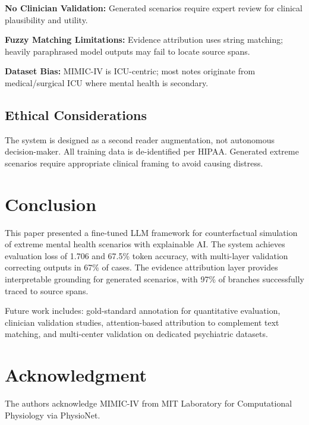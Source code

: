 \documentclass[conference]{IEEEtran}
\begin{document}
\textbf{No Clinician Validation:} Generated scenarios require expert review for clinical plausibility and utility.

\textbf{Fuzzy Matching Limitations:} Evidence attribution uses string matching; heavily paraphrased model outputs may fail to locate source spans.

\textbf{Dataset Bias:} MIMIC-IV is ICU-centric; most notes originate from medical/surgical ICU where mental health is secondary.

\subsection{Ethical Considerations}

The system is designed as a second reader augmentation, not autonomous decision-maker. All training data is de-identified per HIPAA. Generated extreme scenarios require appropriate clinical framing to avoid causing distress.

\section{Conclusion}

This paper presented a fine-tuned LLM framework for counterfactual simulation of extreme mental health scenarios with explainable AI. The system achieves evaluation loss of 1.706 and 67.5\% token accuracy, with multi-layer validation correcting outputs in 67\% of cases. The evidence attribution layer provides interpretable grounding for generated scenarios, with 97\% of branches successfully traced to source spans.

Future work includes: gold-standard annotation for quantitative evaluation, clinician validation studies, attention-based attribution to complement text matching, and multi-center validation on dedicated psychiatric datasets.

\section*{Acknowledgment}

The authors acknowledge MIMIC-IV from MIT Laboratory for Computational Physiology via PhysioNet.
\end{document}
